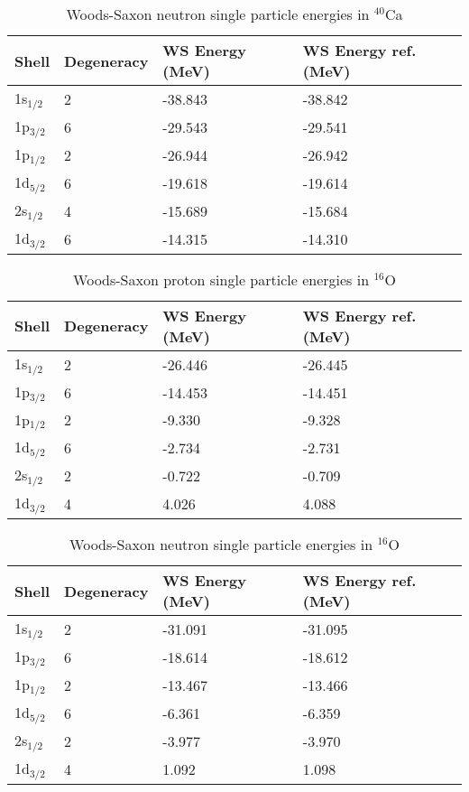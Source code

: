 \begin{table}
\centering
\caption{Woods-Saxon neutron single particle energies in $^\text{40}$Ca}
\begin{tabular}{@{}llll@{}}
\toprule
Shell         & Degeneracy & WS Energy (MeV) &  WS Energy ref. (MeV)\\ \midrule
1s$_{1/2}$    & 2          & -38.843         &  -38.842\\
1p$_{3/2}$    & 6          & -29.543         &  -29.541\\
1p$_{1/2}$    & 2          & -26.944         &  -26.942\\
1d$_{5/2}$    & 6          & -19.618         &  -19.614\\
2s$_{1/2}$    & 4          & -15.689         &  -15.684\\
1d$_{3/2}$    & 6          & -14.315         &  -14.310\\
\bottomrule
\end{tabular}
\end{table}

\begin{table}[h!]
\centering
\caption{Woods-Saxon proton single particle energies in $^\text{16}$O}
\begin{tabular}{@{}llll@{}}
\toprule
Shell         & Degeneracy & WS Energy (MeV)& WS Energy ref. (MeV)\\ \midrule
1s$_{1/2}$    & 2          & -26.446        & -26.445 \\
1p$_{3/2}$    & 6          & -14.453        &  -14.451\\
1p$_{1/2}$    & 2          & -9.330         &  -9.328\\
1d$_{5/2}$    & 6          & -2.734         &  -2.731\\
2s$_{1/2}$    & 2          & -0.722         &  -0.709\\
1d$_{3/2}$    & 4          & 4.026          &  4.088\\
\bottomrule
\end{tabular}
\end{table}
\begin{table}[h!]
\centering
\caption{Woods-Saxon neutron single particle energies in $^\text{16}$O}
\begin{tabular}{@{}llll@{}}
\toprule
Shell         & Degeneracy & WS Energy (MeV)& WS Energy ref. (MeV)\\ \midrule
1s$_{1/2}$    & 2          & -31.091        &  -31.095\\
1p$_{3/2}$    & 6          & -18.614        &  -18.612\\
1p$_{1/2}$    & 2          & -13.467        &  -13.466\\
1d$_{5/2}$    & 6          & -6.361         &  -6.359\\
2s$_{1/2}$    & 2          & -3.977         &  -3.970\\
1d$_{3/2}$    & 4          & 1.092          &  1.098\\
\bottomrule
\end{tabular}
\end{table}